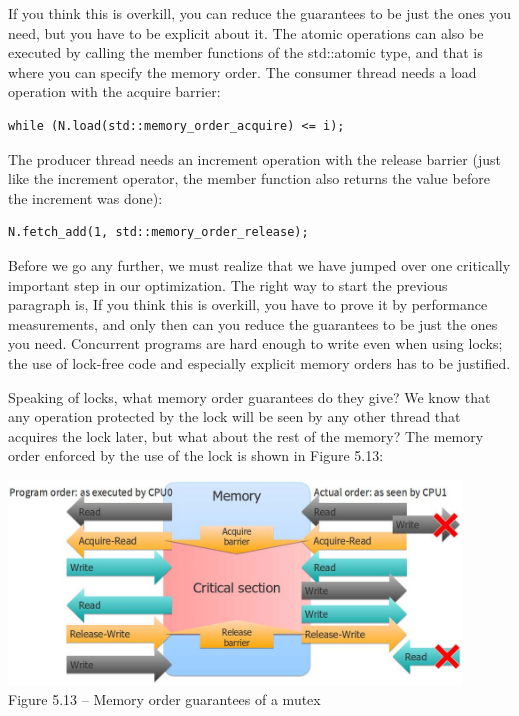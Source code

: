 If you think this is overkill, you can reduce the guarantees to be just the ones you need, but you have to be explicit about it. The atomic operations can also be executed by calling the member functions of the std::atomic type, and that is where you can specify the memory order. The consumer thread needs a load operation with the acquire barrier:

\begin{lstlisting}[style=styleCXX]
while (N.load(std::memory_order_acquire) <= i);
\end{lstlisting}

The producer thread needs an increment operation with the release barrier (just like the increment operator, the member function also returns the value before the increment was done):

\begin{lstlisting}[style=styleCXX]
N.fetch_add(1, std::memory_order_release);
\end{lstlisting}

Before we go any further, we must realize that we have jumped over one critically important step in our optimization. The right way to start the previous paragraph is, If you think this is overkill, you have to prove it by performance measurements, and only then can you reduce the guarantees to be just the ones you need. Concurrent programs are hard enough to write even when using locks; the use of lock-free code and especially explicit memory orders has to be justified.

Speaking of locks, what memory order guarantees do they give? We know that any operation protected by the lock will be seen by any other thread that acquires the lock later, but what about the rest of the memory? The memory order enforced by the use of the lock is shown in Figure 5.13:

\begin{center}
\includegraphics[width=0.9\textwidth]{content/1/chapter5/images/13.jpg}\\
Figure 5.13 – Memory order guarantees of a mutex
\end{center}


